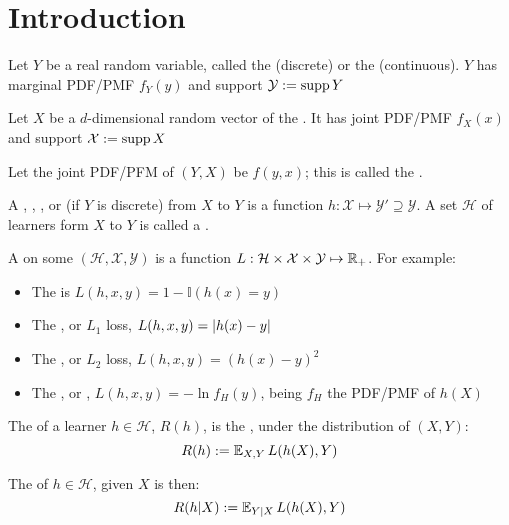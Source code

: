 \section{Introduction}

Let $Y$ be a real random variable, called the  (discrete) or the  (continuous). $Y$ has marginal PDF/PMF $f_Y(y)$ and support  $\mathcal{Y}:=\operatorname{supp}{Y}$\medskip 

Let $X$ be a $d$-dimensional random vector of the . It has joint PDF/PMF $f_X(x)$ and support $\mathcal{X}:=\operatorname{supp}{X}$\medskip

Let the joint PDF/PFM of $(Y,X)$ be $f(y,x)$; this is called the .\medskip

A , , ,  or  (if $Y$ is discrete) from $X$ to $Y$ is a function $h:\mathcal{X}\mapsto\mathcal{Y}'\supseteq \mathcal{Y}$. A set $\mathcal{H}$ of learners form $X$ to $Y$ is called a .\medskip

A  on some $(\mathcal{H},\mathcal{X},\mathcal{Y})$ is a function $L:\mathcal{H}\times \mathcal{X}\times\mathcal{Y}\mapsto \operatorname{\mathbb{R}}_+$. For example:

\begin{itemize}
    \item The  is $L(h,{x},y)=1-\mathbb{I}(h({x})=y)$
    \item The , or $L_1 $ loss, $L(h,{x},y)=\abs{h({x})-y}$
    \item The , or $L_2$ loss, $L(h,{x},y)=(h({x})-y)^2$
    \item The , or , $L(h,x,y)=-\ln f_H(y)$, being $f_H$ the PDF/PMF of $h(X)$
\end{itemize}

The  of a learner $h\in\mathcal{H}$, $R(h)$, is the , under the distribution of $(X,Y)$:
\begin{equation*}
    R(h) := \operatorname{\mathbb{E}}_{X,Y} L(h(X),Y)
\end{equation*}

The  of $h\in\mathcal{H}$, given $X$ is then:
\begin{equation*}
    R(h|X) := \operatorname{\mathbb{E}}_{Y|X} L(h(X),Y)
\end{equation*}

